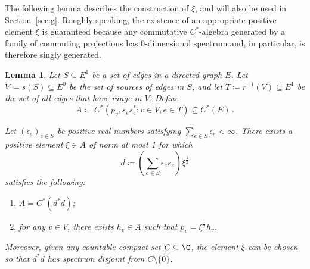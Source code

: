 \documentclass[12pt, a4paper]
{amsart}
\newtheorem{lemma}[thm]{Lemma}
\theoremstyle{definition}
\theoremstyle{remark}
\numberwithin{equation}{section}
\newcommand{\Cstar}{\ensuremath{C^*}}
\begin{document}
The following lemma describes the construction of $\xi$, and will also be used in Section~\ref{sec:g}. Roughly speaking, the existence of an appropriate positive element $\xi$ is guaranteed because any commutative \Cstar-algebra generated by a family of commuting projections has 0-dimensional spectrum and, in particular, is therefore singly generated.


\begin{lemma}\label{lemma:funny-function}
    Let $S \subseteq E^1$ be a set of edges in a directed graph $E$. Let $V \coloneq s(S) \subseteq E^0$ be the set of sources of edges in $S$, and let $T \coloneq r^{-1}(V) \subseteq E^1$ be the set of all edges that have range in $V$. Define 
    \begin{equation}
        A \coloneq \Cstar(p_v, s_e s_e^* \colon v \in V, e \in T) \subseteq \Cstar(E)\,.
    \end{equation}
    
    Let $(\epsilon_e)_{e \in S}$ be positive real numbers satisfying $\sum_{e \in S} \epsilon_e < \infty$. There exists a positive element $\xi \in A$ of norm at most 1 for which
    \begin{equation}
    d \coloneq \left( \sum_{e \in S} \epsilon_e s_e \right)\xi^{\frac{1}{2}}
    \end{equation}
    satisfies the following:
    \begin{enumerate}[label=(\roman*)]
        \item $A = \Cstar(d^*d)$;
        \item for any $v \in V$, there exists $h_v \in A$ such that $p_v = \xi^{\frac{1}{2}} h_v$.
    \end{enumerate}
    Moreover, given any countable compact set $C \subseteq \C$, the element $\xi$ can be chosen so that $d^*d$ has spectrum disjoint from $C \setminus \{0\}$.
\end{lemma}
\end{document}
